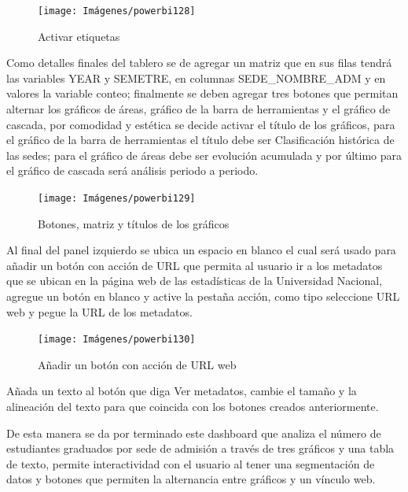 \documentclass[
]{book}
\begin{document}
\begin{figure}

{\centering \texttt{[image: Imágenes/powerbi128]} 

}

\caption{Activar etiquetas}\label{fig:paso5graficobarradeherramientas-fig}
\end{figure}

Como detalles finales del tablero se de agregar un matriz que en sus filas tendrá las variables YEAR y SEMETRE, en columnas SEDE\_NOMBRE\_ADM y en valores la variable conteo; finalmente se deben agregar tres botones que permitan alternar los gráficos de áreas, gráfico de la barra de herramientas y el gráfico de cascada, por comodidad y estética se decide activar el título de los gráficos, para el gráfico de la barra de herramientas el título debe ser Clasificación histórica de las sedes; para el gráfico de áreas debe ser evolución acumulada y por último para el gráfico de cascada será análisis periodo a periodo.

\begin{figure}

{\centering \texttt{[image: Imágenes/powerbi129]} 

}

\caption{Botones, matriz y títulos de los gráficos}\label{fig:detallesgraficobarradeherramientas-fig}
\end{figure}

Al final del panel izquierdo se ubica un espacio en blanco el cual será usado para añadir un botón con acción de URL que permita al usuario ir a los metadatos que se ubican en la página web de las estadísticas de la Universidad Nacional, agregue un botón en blanco y active la pestaña acción, como tipo seleccione URL web y pegue la URL de los metadatos.

\begin{figure}

{\centering \texttt{[image: Imágenes/powerbi130]} 

}

\caption{Añadir un botón con acción de URL web}\label{fig:botonurlgraficobarradeherramientas-fig}
\end{figure}

Añada un texto al botón que diga Ver metadatos, cambie el tamaño y la alineación del texto para que coincida con los botones creados anteriormente.

De esta manera se da por terminado este dashboard que analiza el número de estudiantes graduados por sede de admisión a través de tres gráficos y una tabla de texto, permite interactividad con el usuario al tener una segmentación de datos y botones que permiten la alternancia entre gráficos y un vínculo web.
\end{document}
